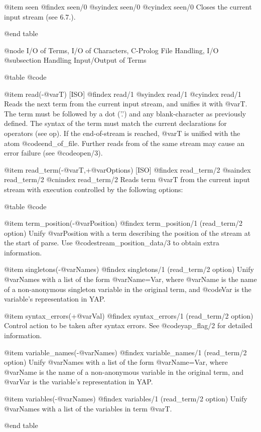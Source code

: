 {{{{{@item seen
@findex seen/0
@syindex seen/0
@cyindex seen/0
Closes the current input stream (see 6.7.).

@end table

@node I/O of Terms, I/O of Characters, C-Prolog File Handling, I/O
@subsection Handling Input/Output of Terms

@table @code

@item read(-@var{T}) [ISO]
@findex read/1
@syindex read/1
@cyindex read/1
Reads the next term from the current input stream, and unifies it with
@var{T}. The term must be followed by a dot ('.') and any blank-character
as previously defined. The syntax of the term must match the current
declarations for operators (see op). If the end-of-stream is reached, 
@var{T} is unified with the atom @code{end_of_file}. Further reads from of 
the same stream may cause an error failure (see @code{open/3}).

@item read_term(-@var{T},+@var{Options}) [ISO]
@findex read_term/2
@saindex read_term/2
@cnindex read_term/2
Reads term @var{T} from the current input stream with execution
controlled by the following options:

@table @code

@item  term_position(-@var{Position})
@findex term_position/1 (read_term/2 option)
Unify @var{Position} with a term describing the position of the stream
at the start of parse. Use @code{stream_position_data/3} to obtain extra
information.

@item  singletons(-@var{Names})
@findex singletons/1 (read_term/2 option)
Unify @var{Names} with a list of the form @var{Name=Var}, where
@var{Name} is the name of a non-anonymous singleton variable in the
original term, and @code{Var} is the variable's representation in
YAP.

@item  syntax_errors(+@var{Val})
@findex syntax_errors/1 (read_term/2 option)
Control action to be taken after syntax errors. See @code{yap_flag/2}
for detailed information.

@item  variable_names(-@var{Names})
@findex variable_names/1 (read_term/2 option)
Unify @var{Names} with a list of the form @var{Name=Var}, where @var{Name} is
the name of a non-anonymous variable in the original term, and @var{Var}
is the variable's representation in YAP.

@item  variables(-@var{Names})
@findex variables/1 (read_term/2 option)
Unify @var{Names} with a list of the variables in term @var{T}.

@end table

}}}}}
